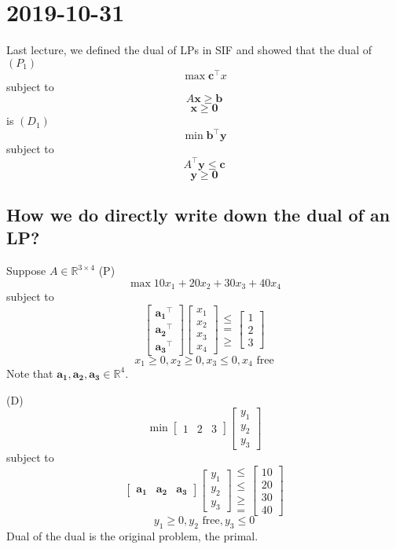 \section{2019-10-31}
Last lecture, we defined the dual of LPs in SIF and showed that
the dual of
$ (P_1) $
\[ \max \bm{c}^\top x\]
subject to
\[ A \bm{x}\ge \bm{b} \]
\[ \bm{x}\ge \bm{0} \]
is
$ (D_1) $
\[ \min \bm{b}^\top \bm{y} \]
subject to
\[ A ^\top \bm{y}\le \bm{c} \]
\[ \bm{y}\ge \bm{0} \]

\subsection{How we do directly write down the dual of an LP?}
Suppose $ A\in\mathbb{R}^{3\times 4} $
(P)
\[ \max 10x_1+20x_2+30x_3+40x_4 \]
subject to
\[ \begin{bmatrix}
    \bm{a_1}^\top\\
    \bm{a_2}^\top\\
    \bm{a_3}^\top
\end{bmatrix}
\begin{bmatrix}
    x_1\\
    x_2\\
    x_3\\
    x_4
\end{bmatrix}
\begin{matrix}
    \le\\
    =\\
    \ge
\end{matrix}
\begin{bmatrix}
    1\\
    2\\
    3
\end{bmatrix}\]
\[ x_1\ge 0, x_2\ge 0, x_3\le 0, x_4 \text{ free} \]
Note that $ \bm{a_1},\bm{a_2},\bm{a_3}\in \mathbb{R}^{4} $.

(D)
\[ \min \begin{bmatrix}
    1 & 2 & 3
\end{bmatrix}
\begin{bmatrix}
    y_1\\
    y_2\\
    y_3
\end{bmatrix}\]
subject to
\[ 
\begin{bmatrix}
    \bm{a_1} & \bm{a_2} & \bm{a_3}
\end{bmatrix}
\begin{bmatrix}
    y_1\\
    y_2\\
    y_3
\end{bmatrix}
\begin{matrix}
    \le\\
    \le\\
    \ge\\
    =
\end{matrix}
\begin{bmatrix}
    10\\
    20\\
    30\\
    40
\end{bmatrix}\]
\[ y_1\ge 0, y_2 \text{ free}, y_3\le 0 \]
Dual of the dual is the original problem, the primal.

